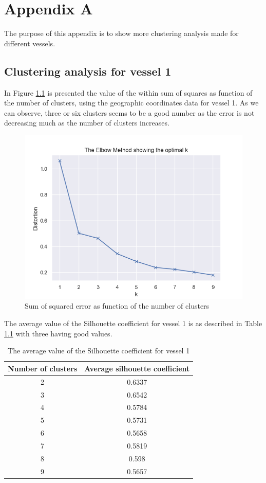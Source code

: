 \chapter{Appendix A} 
\label{appendix:anexo1}

The purpose of this appendix is to show more clustering analysis made for different vessels.

\section{Clustering analysis for vessel 1} %
\label{sub:clustering_vessel_1}
In Figure \ref{fig:elbow_method_1} is presented the value of the within sum of squares as function of the number of clusters, using the geographic coordinates data for vessel 1. As we can observe, three or six clusters seems to be a good number as the error is not decreasing much as the number of clusters increases. 


\begin{figure}[]
\centering
\includegraphics[width=0.8\linewidth]{Chapters/img/elbow_method1.png}
\caption{Sum of squared error as function of the number of clusters}
\label{fig:elbow_method_1}
\end{figure}


The average value of the Silhouette coefficient for vessel 1 is as described in Table \ref{table:vessel1_silhouette} with three having good values.

\begin {table}[H]
\caption {The average value of the Silhouette coefficient for vessel 1}
\begin{center}
\begin{tabular}{c|c}
\textbf{Number of clusters} & \textbf{Average silhouette coefficient}  \\
\hline
2 & 0.6337 \\
3 & 0.6542 \\
4 & 0.5784 \\
5 & 0.5731 \\
6 & 0.5658 \\
7 & 0.5819 \\
8 & 0.598 \\
9 & 0.5657
\label{table:vessel1_silhouette}
\end{tabular}
\end{center}
\end {table}



